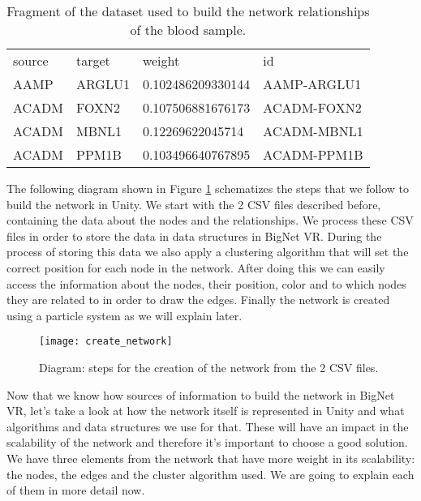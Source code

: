 \begin{table}[h!]
\centering
\begin{tabular}{llll}
\hline
source & target & weight            & id          \\
AAMP   & ARGLU1 & 0.102486209330144 & AAMP-ARGLU1 \\
ACADM  & FOXN2  & 0.107506881676173 & ACADM-FOXN2 \\
ACADM  & MBNL1  & 0.12269622045714  & ACADM-MBNL1 \\
ACADM  & PPM1B  & 0.103496640767895 & ACADM-PPM1B \\
\hline
\end{tabular}
\caption{Fragment of the dataset used to build the network relationships of the blood sample.}
\label{tab:network-data}
\end{table}

The following diagram shown in Figure \ref{fig:create_network} schematizes the steps that we follow to build the network in Unity. We start with the 2 CSV files described before, containing the data about the nodes and the relationships. We process these CSV files in order to store the data in data structures in BigNet VR. During the process of storing this data we also apply a clustering algorithm that will set the correct position for each node in the network. After doing this we can easily access the information about the nodes, their position, color and to which nodes they are related to in order to draw the edges. Finally the network is created using a particle system as we will explain later.

\begin{figure}[h!]
    \centering%
    \texttt{[image: create\_network]}
    \caption{Diagram: steps for the creation of the network from the 2 CSV files.}
    \label{fig:create_network}
\end{figure}%

Now that we know how sources of information to build the network in BigNet VR, let's take a look at how the network itself is represented in Unity and what algorithms and data structures we use for that. These will have an impact in the scalability of the network and therefore it's important to choose a good solution. We have three elements from the network that have more weight in its scalability: the nodes, the edges and the cluster algorithm used. We are going to explain each of them in more detail now.

